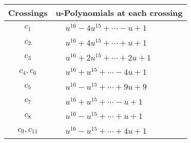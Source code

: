 \documentclass[1p]{elsarticle_modified}
\theoremstyle{definition}
\begin{document}
\begin{tabular}{m{50pt}|m{274pt}}
Crossings & \hspace{64pt}u-Polynomials at each crossing \\
\hline $$\begin{aligned}c_{1}\end{aligned}$$&$\begin{aligned}
&u^{16}-4 u^{15}+\cdots- u+1
\end{aligned}$\\
\hline $$\begin{aligned}c_{2}\end{aligned}$$&$\begin{aligned}
&u^{16}+4 u^{15}+\cdots+u+1
\end{aligned}$\\
\hline $$\begin{aligned}c_{3}\end{aligned}$$&$\begin{aligned}
&u^{16}+2 u^{15}+\cdots+2 u+1
\end{aligned}$\\
\hline $$\begin{aligned}c_{4},c_{6}\end{aligned}$$&$\begin{aligned}
&u^{16}+u^{15}+\cdots-4 u+1
\end{aligned}$\\
\hline $$\begin{aligned}c_{5}\end{aligned}$$&$\begin{aligned}
&u^{16}- u^{15}+\cdots+9 u+9
\end{aligned}$\\
\hline $$\begin{aligned}c_{7}\end{aligned}$$&$\begin{aligned}
&u^{16}+u^{15}+\cdots- u+1
\end{aligned}$\\
\hline $$\begin{aligned}c_{8}\end{aligned}$$&$\begin{aligned}
&u^{16}- u^{15}+\cdots+u+1
\end{aligned}$\\
\hline $$\begin{aligned}c_{9},c_{11}\end{aligned}$$&$\begin{aligned}
&u^{16}- u^{15}+\cdots+4 u+1
\end{aligned}$\\

\end{tabular}
\end{document}
